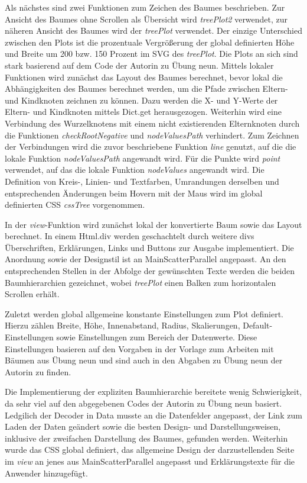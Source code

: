 \documentclass[usegeometry=true]{scrartcl}
\begin{document}
Als nächstes sind zwei Funktionen zum Zeichen des Baumes beschrieben. Zur Ansicht des Baumes ohne Scrollen als Übersicht wird \textit{treePlot2} verwendet, zur näheren Ansicht des Baumes wird der \textit{treePlot} verwendet. 
Der einzige Unterschied zwischen den Plots ist die prozentuale Vergrößerung der global definierten Höhe und Breite um 200 bzw. 150 Prozent im SVG des \textit{treePlot}.
Die Plots an sich sind stark basierend auf dem Code der Autorin zu Übung neun. Mittels lokaler Funktionen wird zunächst das Layout des Baumes berechnet, bevor lokal die Abhängigkeiten des Baumes berechnet werden, um die Pfade zwischen Eltern- und Kindknoten zeichnen zu können. 
Dazu werden die X- und Y-Werte der Eltern- und Kindknoten mittels Dict.get herausgezogen. Weiterhin wird eine Verbindung des Wurzelknotens mit einem nicht existierenden Elternknoten durch die Funktionen \textit{checkRootNegative} und \textit{nodeValuesPath} verhindert.
Zum Zeichnen der Verbindungen wird die zuvor beschriebene Funktion \textit{line} genutzt, auf die die lokale Funktion \textit{nodeValuesPath} angewandt wird. Für die Punkte wird \textit{point} verwendet, auf das die lokale Funktion \textit{nodeValues} angewandt wird. 
Die Definition von Kreis-, Linien- und Textfarben, Umrandungen derselben und entsprechenden Änderungen beim Hovern mit der Maus wird im global definierten CSS \textit{cssTree} vorgenommen. 

In der \textit{view}-Funktion wird zunächst lokal der konvertierte Baum sowie das Layout berechnet. In einem Html.div werden geschachtelt durch weitere divs Überschriften, Erklärungen, Links und Buttons zur Ausgabe implementiert. 
Die Anordnung sowie der Designstil ist an MainScatterParallel angepasst. An den entsprechenden Stellen in der Abfolge der gewünschten Texte werden die beiden Baumhierarchien gezeichnet, wobei \textit{treePlot} einen Balken zum horizontalen Scrollen erhält.

Zuletzt werden global allgemeine konstante Einstellungen zum Plot definiert. Hierzu zählen Breite, Höhe, Innenabstand, Radius, Skalierungen, Default-Einstellungen sowie Einstellungen zum Bereich der Datenwerte.
Diese Einstellungen basieren auf den Vorgaben in der Vorlage zum Arbeiten mit Bäumen aus Übung neun und sind auch in den Abgaben zu Übung neun der Autorin zu finden. 

Die Implementierung der expliziten Baumhierarchie bereitete wenig Schwierigkeit, da sehr viel auf den abgegebenen Codes der Autorin zu Übung neun basiert. 
Ledgilich der Decoder in Data musste an die Datenfelder angepasst, der Link zum Laden der Daten geändert sowie die besten Design- und Darstellungsweisen, inklusive der zweifachen Darstellung des Baumes, gefunden werden. 
Weiterhin wurde das CSS global definiert, das allgemeine Design der darzustellenden Seite im \textit{view} an jenes aus MainScatterParallel angepasst und Erklärungstexte für die Anwender hinzugefügt. 
\end{document}
